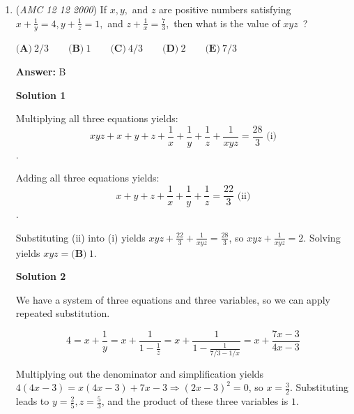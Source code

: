 \begin{enumerate}
 



\textbf{Solution 2}

The area of $ADE$ is $\frac{DE\cdot h}{2}=\frac{DE}{BC} \cdot \frac{BC\cdot h}{2}=\frac{DE}{BC}[ABC]$ where $h$ is the height of triangle $ABC$. Using Angle Bisector Theorem, we find $\frac{13}{BE}=\frac{15}{14-BE}$, which we solve to get $BE=\frac{13}{2}$. $D$ is the midpoint of $BC$ so $BD=7$. Thus we get the base of triangle $ADE, DE$, to be $\frac{1}{2}$ units long. We can now use \href{https://artofproblemsolving.com/wiki/index.php?title=Heron\%27s\_Formula}{Heron's Formula} on $ABC$.
 \[s=\frac{AB+BC+AC}{2}=21\]
 \[[ABC]=\sqrt{(s)(s-AB)(s-BC)(s-AC)}=\sqrt{(21)(8)(7)(6)}=84\]
 \[\frac{DE}{BC}[ABC]=\frac{\frac{1}{2}}{14}\cdot 84=3\]Therefore, the answer is $\mathrm{C}$.

 


	\item (\textit{AMC 12 12 2000}) If $x,y,$ and $z$ are positive numbers satisfying $x + \frac{1}{y} = 4, y + \frac{1}{z} = 1,$ and $z + \frac{1}{x} = \frac73,$ then what is the value of $xyz$ ?


 $\textbf {(A)}\ 2/3 \qquad \textbf {(B)}\ 1 \qquad \textbf {(C)}\ 4/3 \qquad \textbf {(D)}\ 2 \qquad \textbf {(E)}\ 7/3$

 \textbf{Answer: }B



\textbf{Solution 1}

Multiplying all three equations yields: 
 \[xyz + x + y + z + \frac{1}{x} + \frac{1}{y} + \frac{1}{z} + \frac{1}{xyz} = \frac{28}{3} \text{ (i)}\].

 Adding all three equations yields: 
 \[x + y + z + \frac{1}{x} + \frac{1}{y} + \frac{1}{z} = \frac{22}{3} \text{ (ii)}\].

 Substituting (ii) into (i) yields $xyz + \frac{22}{3} + \frac{1}{xyz} = \frac{28}{3}$, so $xyz + \frac{1}{xyz} = 2$.  Solving yields $xyz = \boxed{\textbf{(B)}\ 1}$.

 



\textbf{Solution 2}

We have a system of three equations and three variables, so we can apply repeated substitution. 

 
 \[4 = x + \frac{1}{y} = x + \frac{1}{1 - \frac{1}{z}} = x + \frac{1}{1-\frac{1}{7/3-1/x}} = x + \frac{7x-3}{4x-3}\]

 Multiplying out the denominator and simplification yields $4(4x-3) = x(4x-3) + 7x - 3 \Longrightarrow (2x-3)^2 = 0$, so $x = \frac{3}{2}$. Substituting leads to $y = \frac{2}{5}, z = \frac{5}{3}$, and the product of these three variables is $1$.


\end{enumerate}
